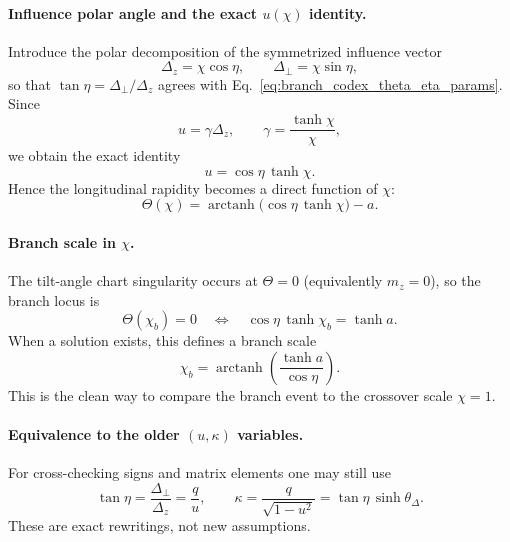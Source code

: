 \paragraph{Influence polar angle and the exact \texorpdfstring{$u(\chi)$}{u(chi)} identity.}
Introduce the polar decomposition of the symmetrized influence vector
\begin{equation}
    \Delta_z = \chi\cos\eta,
    \qquad
    \Delta_\perp = \chi\sin\eta,
    \label{eq:branch_codex_delta_polar}
\end{equation}
so that $\tan\eta=\Delta_\perp/\Delta_z$ agrees with
Eq.~\eqref{eq:branch_codex_theta_eta_params}.  Since
\begin{equation}
    u = \gamma\Delta_z,
    \qquad \gamma = \frac{\tanh\chi}{\chi},
\end{equation}
we obtain the exact identity
\begin{equation}
    u = \cos\eta\,\tanh\chi.
    \label{eq:branch_codex_u_chi_eta}
\end{equation}
Hence the longitudinal rapidity becomes a direct function of $\chi$:
\begin{equation}
    \Theta(\chi)
    = \operatorname{arctanh}\!\bigl(\cos\eta\,\tanh\chi\bigr)-a.
    \label{eq:branch_codex_Theta_of_chi}
\end{equation}

\paragraph{Branch scale in \texorpdfstring{$\chi$}{chi}.}
The tilt-angle chart singularity occurs at $\Theta=0$ (equivalently $m_z=0$),
so the branch locus is
\begin{equation}
    \Theta(\chi_b)=0
    \quad\Longleftrightarrow\quad
    \cos\eta\,\tanh\chi_b = \tanh a.
    \label{eq:branch_codex_branch_scale_condition}
\end{equation}
When a solution exists, this defines a branch scale
\begin{equation}
    \chi_b = \operatorname{arctanh}\!\left(\frac{\tanh a}{\cos\eta}\right).
    \label{eq:branch_codex_chi_b}
\end{equation}
This is the clean way to compare the branch event to the crossover scale
$\chi=1$.

\paragraph{Equivalence to the older \texorpdfstring{$(u,\kappa)$}{(u,kappa)} variables.}
For cross-checking signs and matrix elements one may still use
\begin{equation}
    \tan\eta
    = \frac{\Delta_\perp}{\Delta_z}
    = \frac{q}{u},
    \qquad
    \kappa
    = \frac{q}{\sqrt{1-u^2}}
    = \tan\eta\,\sinh\theta_\Delta.
    \label{eq:branch_codex_kappa_eta_thetaDelta}
\end{equation}
These are exact rewritings, not new assumptions.

